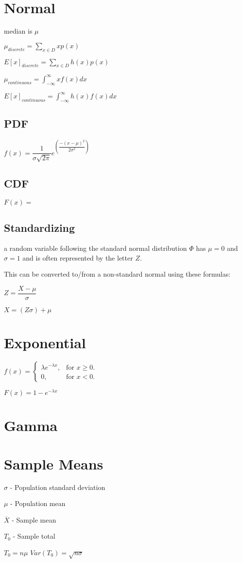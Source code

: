 \documentclass[12pt,fleqn]{article}
\begin{document}
\section{Normal}

median is $\mu$

$\mu_{discrete} = \sum_{x \in D} x p(x)$

$E[x]_{discrete} = \sum_{x \in D} h(x) p(x)$

$\mu_{continuous} = \int_{-\infty}^{\infty} x f(x) dx$

$E[x]_{continuous} = \int_{-\infty}^{\infty} h(x) f(x) dx$

\subsection{PDF}
$f(x) = \dfrac{1}{\sigma\sqrt{2\pi}}e^{(\dfrac{-(x-\mu)^2}{2\sigma^2})}$
\subsection{CDF}
$F(x) = $

\subsection{Standardizing}
a random variable following the standard normal distribution $\Phi$ has $\mu = 0$ and $\sigma = 1$ and is often represented by the letter $Z$.

This can be converted to/from a non-standard normal using these formulas:

$Z = \dfrac{X-\mu}{\sigma}$


$X = (Z \sigma) + \mu$


\section{Exponential}


$
f(x)=\begin{cases}
\lambda e^{-\lambda x}, & \text{for $x\ge0$}.\\
0, & \text{for $x<0$}.
\end{cases}
$

$ F(x)=1-e^{-\lambda x} $
\section{Gamma}


\section{Sample Means}

$\sigma$ - Population standard deviation

$\mu$ - Population mean

$\overline{X}$ - Sample mean

$T_0$ - Sample total


$T_0 = n\mu$
$Var(T_0) = \sqrt{n\sigma} $
\end{document}
